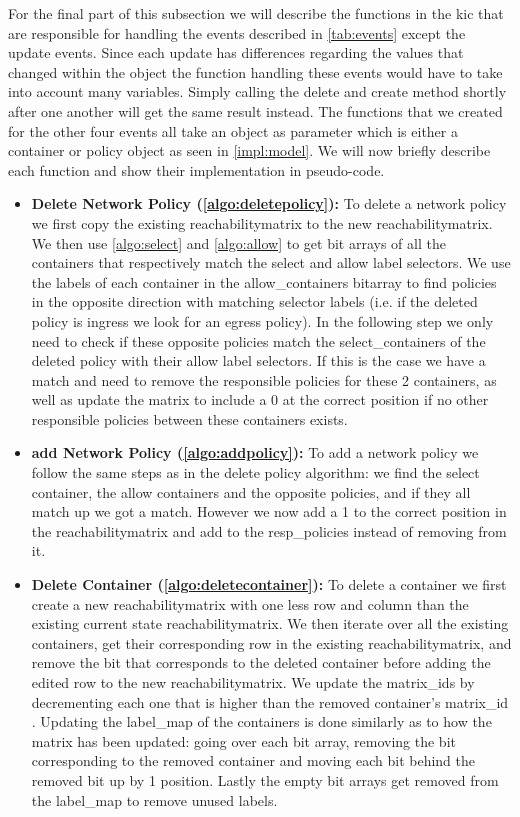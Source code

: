 \newpage
For the final part of this subsection we will describe the functions in the \acrshort{kic} that are responsible for handling the events described in \autoref{tab:events} except the update events. Since each update has differences regarding the values that changed within the object the function handling these events would have to take into account many variables. Simply calling the delete and create method shortly after one another will get the same result instead. The functions that we created for the other four events all take an object as parameter which is either a container or policy object as seen in \autoref{impl:model}. We will now briefly describe each function and show their implementation in pseudo-code.  
\\[10pt]
\begin{itemize}
    \item \textbf{Delete Network Policy (\autoref{algo:deletepolicy}):} To delete a network policy we first copy the existing reachabilitymatrix to the new reachabilitymatrix. We then use \autoref{algo:select} and \autoref{algo:allow} to get bit arrays of all the containers that respectively match the select and allow label selectors. We use the labels of each container in the allow\_containers bitarray to find policies in the opposite direction with matching selector labels (i.e. if the deleted policy is ingress we look for an egress policy). In the following step we only need to check if these opposite policies match the select\_containers of the deleted policy with their allow label selectors. If this is the case we have a match and need to remove the responsible policies for these 2 containers, as well as update the matrix to include a 0 at the correct position if no other responsible policies between these containers exists.
    
    \item \textbf{add Network Policy (\autoref{algo:addpolicy}):} To add a network policy we follow the same steps as in the delete policy algorithm: we find the select container, the allow containers and the opposite policies, and if they all match up we got a match. However we now add a 1 to the correct position in the reachabilitymatrix and add to the resp\_policies instead of removing from it.
    
    \item \textbf{Delete Container (\autoref{algo:deletecontainer}):} To delete a container we first create a new reachabilitymatrix with one less row and column than the existing current state reachabilitymatrix. We then iterate over all the existing containers, get their corresponding row in the existing reachabilitymatrix, and remove the bit that corresponds to the deleted container before adding the edited row to the new reachabilitymatrix. We update the matrix\_ids by decrementing each one that is higher than the removed container's matrix\_id . Updating the label\_map of the containers is done similarly as to how the matrix has been updated: going over each bit array, removing the bit corresponding to the removed container and moving each bit behind the removed bit up by 1 position. Lastly the empty bit arrays get removed from the label\_map to remove unused labels.
    

\end{itemize}
